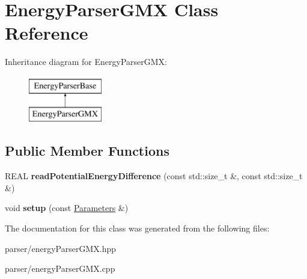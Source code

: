 \hypertarget{classEnergyParserGMX}{}\section{Energy\+Parser\+G\+MX Class Reference}
\label{classEnergyParserGMX}
Inheritance diagram for Energy\+Parser\+G\+MX\+:\begin{figure}[H]
\begin{center}
\leavevmode
\includegraphics[height=2.000000cm]{classEnergyParserGMX}
\end{center}
\end{figure}
\subsection*{Public Member Functions}
\begin{DoxyCompactItemize}
\item 
\mbox{\label{classEnergyParserGMX_a8dbcd08101660ce96628155c3ccc2063}} 
R\+E\+AL {\bfseries read\+Potential\+Energy\+Difference} (const std\+::size\+\_\+t \&, const std\+::size\+\_\+t \&)
\item 
\mbox{\label{classEnergyParserGMX_ac1159165d7a5f9c5d82f46bbd1834e38}} 
void {\bfseries setup} (const \mbox{\hyperlink{classParameters}{Parameters}} \&)
\end{DoxyCompactItemize}


The documentation for this class was generated from the following files\+:\begin{DoxyCompactItemize}
\item 
parser/energy\+Parser\+G\+M\+X.\+hpp\item 
parser/energy\+Parser\+G\+M\+X.\+cpp\end{DoxyCompactItemize}
